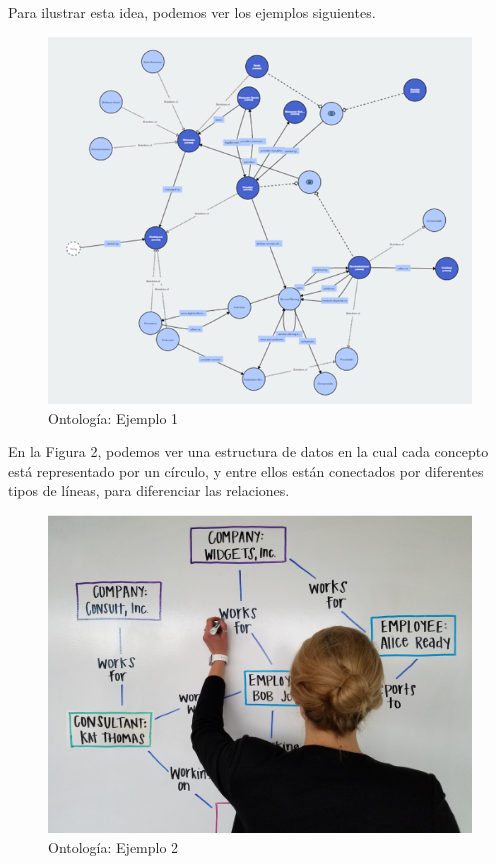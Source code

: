 Para ilustrar esta idea, podemos ver los ejemplos siguientes.

\begin{figure}[ht]
   \begin{center}
      \includegraphics[width=0.7\linewidth]{introduction/figures/ontology_example.jpg}
   \end{center}
   \caption[Ontología: Ejemplo 1]
   {\footnotesize Ontología: Ejemplo 1}
   \label{fig:mufigure6}
\end{figure}

En la Figura 2, podemos ver una estructura de datos en la cual cada concepto está representado por un círculo, y entre ellos están conectados por diferentes tipos de líneas, para diferenciar las relaciones.

\begin{figure}[ht]
   \begin{center}
      \includegraphics[width=0.7\linewidth]{introduction/figures/ontology_example_2.png}
   \end{center}
   \caption[Ontología: Ejemplo 2]
   {\footnotesize Ontología: Ejemplo 2}
   \label{fig:mufigure6}
\end{figure}

